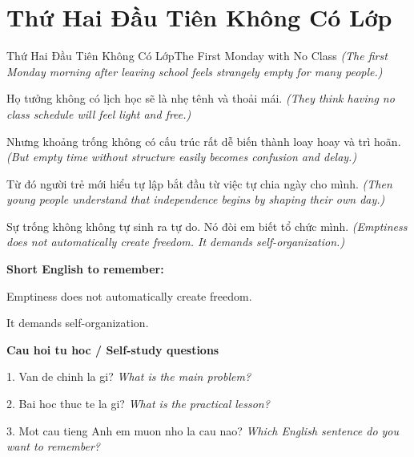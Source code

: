 \section{Thứ Hai Đầu Tiên Không Có Lớp}
\begin{truyen}{Thứ Hai Đầu Tiên Không Có Lớp}{The First Monday with No Class}
\textit{(The first Monday morning after leaving school feels strangely empty for many people.)}

Họ tưởng không có lịch học sẽ là nhẹ tênh và thoải mái.
\textit{(They think having no class schedule will feel light and free.)}

Nhưng khoảng trống không có cấu trúc rất dễ biến thành loay hoay và trì hoãn.
\textit{(But empty time without structure easily becomes confusion and delay.)}

Từ đó người trẻ mới hiểu tự lập bắt đầu từ việc tự chia ngày cho mình.
\textit{(Then young people understand that independence begins by shaping their own day.)}

\end{truyen}

\begin{baihoc}
Sự trống không không tự sinh ra tự do. Nó đòi em biết tổ chức mình.
\textit{(Emptiness does not automatically create freedom. It demands self-organization.)}
\end{baihoc}

\begin{ghinhoanh}
\textbf{Short English to remember:}

Emptiness does not automatically create freedom.

It demands self-organization.

\end{ghinhoanh}

\begin{tuhocnhanh}
\textbf{Cau hoi tu hoc / Self-study questions}

1. Van de chinh la gi? \textit{What is the main problem?}

2. Bai hoc thuc te la gi? \textit{What is the practical lesson?}

3. Mot cau tieng Anh em muon nho la cau nao? \textit{Which English sentence do you want to remember?}
\end{tuhocnhanh}
\ngancach

